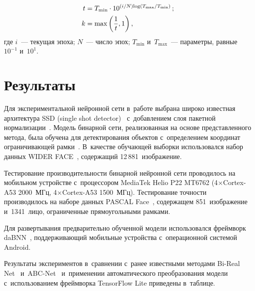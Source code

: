 \begin{multicols}{2}
\noindent
\begin{align*}
t &= T_{\min} \cdot 10^{(i/N)\mathrm{log}\left (T_{\max}/T_{\min}\right)}\,;\\
k&= \max\left( \displaystyle\frac{\displaystyle 1\mathstrut}{\displaystyle t\mathstrut}, 1\right),
\end{align*}
где $i$~--- текущая эпоха; $N$~--- чис\-ло эпох; $T_{\min}$ и~$T_{\max}$~---  
па\-ра\-мет\-ры, рав\-ные $10^{-1}$ и~$10^1$.

\vspace*{-6pt}

\section{Результаты}

  Для экспериментальной нейронной сети в~работе выбрана широко известная 
архитектура SSD (single shot detector)~\cite{9-mal} с~до\-бав\-ле\-ни\-ем слоя пакетной 
нормализации~\cite{10-mal}. Модель бинарной сети, реализованная на основе 
пред\-став\-лен\-но\-го метода, была обуче\-на для детектирования объектов 
с~определением координат огра\-ни\-чи\-ва\-ющей рамки~\cite{12-mal}. 
В~качестве обуча\-ющей выборки использовался набор данных WIDER 
FACE~\cite{11-mal}, содержащий 12\,881~изоб\-ра\-же\-ние. 
  
  Тестирование производительности бинарной нейронной сети проводилось на 
мобильном устройстве с~процессором MediaTek Helio P22 MT6762  
(4\;$\times$\;Cortex-A53 2000~МГц, 4\;$\times$\;Cortex-A53 1500~МГц). 
Тестирование точ\-ности производилось на наборе данных PASCAL 
Face~\cite{13-mal}, содержащем 851~изобра\-же\-ние и~1341~лицо, ограниченные 
прямоугольными рам\-ками.
  
   Для развертывания предварительно обученной модели использовался 
фрейм\-ворк daBNN~\cite{14-mal}, под\-дер\-жи\-ва\-ющий мобильные 
устройства с~операционной сис\-те\-мой Android.
  
  Результаты экспериментов в~сравнении с~ранее известными методами Bi-Real 
Net~\cite{7-mal} и~ABC-Net~\cite{8-mal} и~применении автоматического 
преобразования модели с~использованием фрейм\-вор\-ка \mbox{TensorFlow} Lite 
приведены в~таб\-лице.




\end{multicols}
